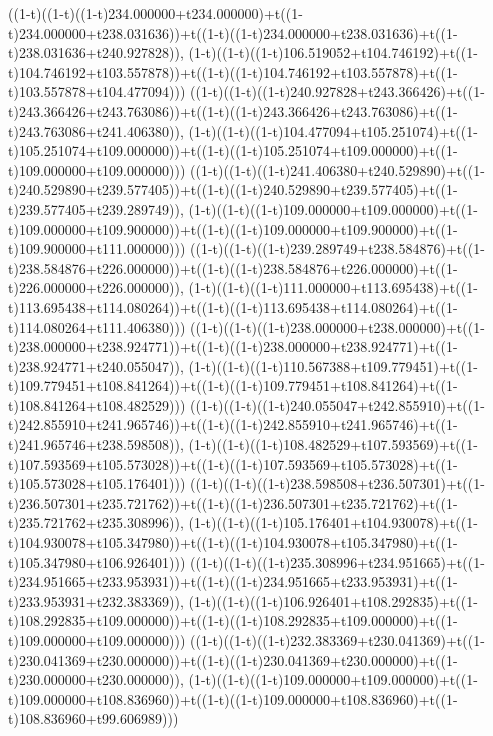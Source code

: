 ((1-t)((1-t)((1-t)234.000000+t234.000000)+t((1-t)234.000000+t238.031636))+t((1-t)((1-t)234.000000+t238.031636)+t((1-t)238.031636+t240.927828)),                                     (1-t)((1-t)((1-t)106.519052+t104.746192)+t((1-t)104.746192+t103.557878))+t((1-t)((1-t)104.746192+t103.557878)+t((1-t)103.557878+t104.477094)))
((1-t)((1-t)((1-t)240.927828+t243.366426)+t((1-t)243.366426+t243.763086))+t((1-t)((1-t)243.366426+t243.763086)+t((1-t)243.763086+t241.406380)),                                     (1-t)((1-t)((1-t)104.477094+t105.251074)+t((1-t)105.251074+t109.000000))+t((1-t)((1-t)105.251074+t109.000000)+t((1-t)109.000000+t109.000000)))
((1-t)((1-t)((1-t)241.406380+t240.529890)+t((1-t)240.529890+t239.577405))+t((1-t)((1-t)240.529890+t239.577405)+t((1-t)239.577405+t239.289749)),                                     (1-t)((1-t)((1-t)109.000000+t109.000000)+t((1-t)109.000000+t109.900000))+t((1-t)((1-t)109.000000+t109.900000)+t((1-t)109.900000+t111.000000)))
((1-t)((1-t)((1-t)239.289749+t238.584876)+t((1-t)238.584876+t226.000000))+t((1-t)((1-t)238.584876+t226.000000)+t((1-t)226.000000+t226.000000)),                                     (1-t)((1-t)((1-t)111.000000+t113.695438)+t((1-t)113.695438+t114.080264))+t((1-t)((1-t)113.695438+t114.080264)+t((1-t)114.080264+t111.406380)))
((1-t)((1-t)((1-t)238.000000+t238.000000)+t((1-t)238.000000+t238.924771))+t((1-t)((1-t)238.000000+t238.924771)+t((1-t)238.924771+t240.055047)),                                     (1-t)((1-t)((1-t)110.567388+t109.779451)+t((1-t)109.779451+t108.841264))+t((1-t)((1-t)109.779451+t108.841264)+t((1-t)108.841264+t108.482529)))
((1-t)((1-t)((1-t)240.055047+t242.855910)+t((1-t)242.855910+t241.965746))+t((1-t)((1-t)242.855910+t241.965746)+t((1-t)241.965746+t238.598508)),                                     (1-t)((1-t)((1-t)108.482529+t107.593569)+t((1-t)107.593569+t105.573028))+t((1-t)((1-t)107.593569+t105.573028)+t((1-t)105.573028+t105.176401)))
((1-t)((1-t)((1-t)238.598508+t236.507301)+t((1-t)236.507301+t235.721762))+t((1-t)((1-t)236.507301+t235.721762)+t((1-t)235.721762+t235.308996)),                                     (1-t)((1-t)((1-t)105.176401+t104.930078)+t((1-t)104.930078+t105.347980))+t((1-t)((1-t)104.930078+t105.347980)+t((1-t)105.347980+t106.926401)))
((1-t)((1-t)((1-t)235.308996+t234.951665)+t((1-t)234.951665+t233.953931))+t((1-t)((1-t)234.951665+t233.953931)+t((1-t)233.953931+t232.383369)),                                     (1-t)((1-t)((1-t)106.926401+t108.292835)+t((1-t)108.292835+t109.000000))+t((1-t)((1-t)108.292835+t109.000000)+t((1-t)109.000000+t109.000000)))
((1-t)((1-t)((1-t)232.383369+t230.041369)+t((1-t)230.041369+t230.000000))+t((1-t)((1-t)230.041369+t230.000000)+t((1-t)230.000000+t230.000000)),                                     (1-t)((1-t)((1-t)109.000000+t109.000000)+t((1-t)109.000000+t108.836960))+t((1-t)((1-t)109.000000+t108.836960)+t((1-t)108.836960+t99.606989)))
